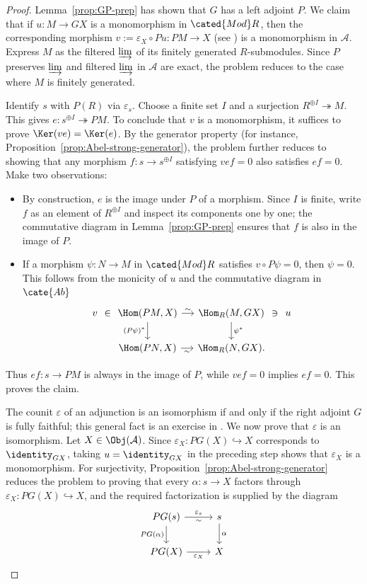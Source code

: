 \begin{proof}
	Lemma~\ref{prop:GP-prep} has shown that $G$ has a left adjoint $P$. We claim that if $u:M\to GX$ is a monomorphism in $\cated{Mod}R$, then the corresponding morphism $v:=\varepsilon_X\circ Pu:PM\to X$ (see \cite[(2.5)]{Li1}) is a monomorphism in $\mathcal{A}$. Express $M$ as the filtered $\varinjlim$ of its finitely generated $R$-submodules. Since $P$ preserves $\varinjlim$ and filtered $\varinjlim$ in $\mathcal{A}$ are exact, the problem reduces to the case where $M$ is finitely generated.

	Identify $s$ with $P(R)$ via $\varepsilon_s$. Choose a finite set $I$ and a surjection $R^{\oplus I}\twoheadrightarrow M$. This gives $e:s^{\oplus I}\twoheadrightarrow PM$. To conclude that $v$ is a monomorphism, it suffices to prove $\Ker(ve)=\Ker(e)$. By the generator property (for instance, Proposition~\ref{prop:Abel-strong-generator}), the problem further reduces to showing that any morphism $f:s\to s^{\oplus I}$ satisfying $vef=0$ also satisfies $ef=0$. Make two observations:
	\begin{itemize}
		\item By construction, $e$ is the image under $P$ of a morphism. Since $I$ is finite, write $f$ as an element of $R^{\oplus I}$ and inspect its components one by one; the commutative diagram in Lemma~\ref{prop:GP-prep} ensures that $f$ is also in the image of $P$.
		\item If a morphism $\psi:N\to M$ in $\cated{Mod}R$ satisfies $v\circ P\psi=0$, then $\psi=0$. This follows from the monicity of $u$ and the commutative diagram in $\cate{Ab}$
		\[\begin{tikzcd}[column sep=small]
			v \arrow[phantom, r, "\in" description]& \Hom(PM, X) \arrow[r, "\sim"] \arrow[d, "{(P\psi)^*}"'] & \Hom_R(M, GX) \arrow[d, "{\psi^*}"] & u \arrow[phantom, l, "\ni" description] \\
			& \Hom(PN, X) \arrow[r, "\sim"'] & \Hom_R(N, GX) . &
		\end{tikzcd}\]
	\end{itemize}
	Thus $ef:s\to PM$ is always in the image of $P$, while $vef=0$ implies $ef=0$. This proves the claim.

	The counit $\varepsilon$ of an adjunction is an isomorphism if and only if the right adjoint $G$ is fully faithful; this general fact is an exercise in . We now prove that $\varepsilon$ is an isomorphism. Let $X\in\Obj(\mathcal{A})$. Since $\varepsilon_X:PG(X)\hookrightarrow X$ corresponds to $\identity_{GX}$, taking $u=\identity_{GX}$ in the preceding step shows that $\varepsilon_X$ is a monomorphism. For surjectivity, Proposition~\ref{prop:Abel-strong-generator} reduces the problem to proving that every $\alpha:s\to X$ factors through $\varepsilon_X:PG(X)\hookrightarrow X$, and the required factorization is supplied by the diagram
	\[\begin{tikzcd}
		PG(s) \arrow[r, "\sim"', "\varepsilon_s"] \arrow[d, "{PG(\alpha)}"'] & s \arrow[d, "\alpha"] \\
		PG(X) \arrow[r, "{\varepsilon_X}"'] & X
	\end{tikzcd}\]


\end{proof}
